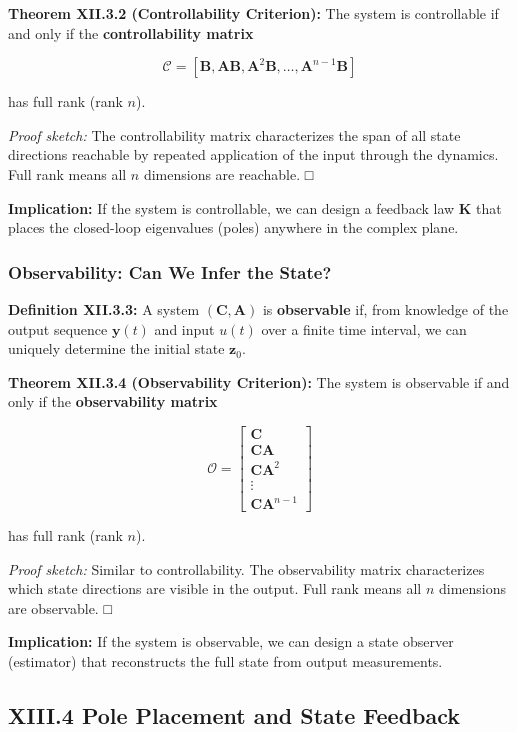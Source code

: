 \documentclass[
]{article}
\begin{document}
\textbf{Theorem XII.3.2 (Controllability Criterion):} The system is
controllable if and only if the \textbf{controllability matrix}

\[\mathcal{C} = [\mathbf{B}, \mathbf{A}\mathbf{B}, \mathbf{A}^2\mathbf{B}, \ldots, \mathbf{A}^{n-1}\mathbf{B}]\]

has full rank (rank \(n\)).

\emph{Proof sketch:} The controllability matrix characterizes the span
of all state directions reachable by repeated application of the input
through the dynamics. Full rank means all \(n\) dimensions are
reachable. □

\textbf{Implication:} If the system is controllable, we can design a
feedback law \(\mathbf{K}\) that places the closed-loop eigenvalues
(poles) anywhere in the complex plane.

\subsubsection{Observability: Can We Infer the
State?}\label{observability-can-we-infer-the-state}

\textbf{Definition XII.3.3:} A system \((\mathbf{C}, \mathbf{A})\) is
\textbf{observable} if, from knowledge of the output sequence
\(\mathbf{y}(t)\) and input \(u(t)\) over a finite time interval, we can
uniquely determine the initial state \(\mathbf{z}_0\).

\textbf{Theorem XII.3.4 (Observability Criterion):} The system is
observable if and only if the \textbf{observability matrix}

\[\mathcal{O} = \begin{bmatrix} \mathbf{C} \\ \mathbf{CA} \\ \mathbf{CA}^2 \\ \vdots \\ \mathbf{CA}^{n-1} \end{bmatrix}\]

has full rank (rank \(n\)).

\emph{Proof sketch:} Similar to controllability. The observability
matrix characterizes which state directions are visible in the output.
Full rank means all \(n\) dimensions are observable. □

\textbf{Implication:} If the system is observable, we can design a state
observer (estimator) that reconstructs the full state from output
measurements.

\subsection{XIII.4 Pole Placement and State
Feedback}\label{xiii.4-pole-placement-and-state-feedback}
\end{document}
